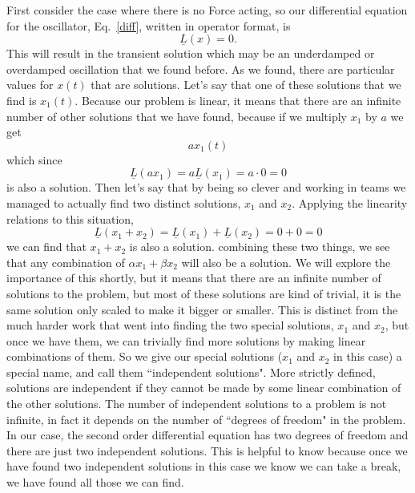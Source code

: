 \documentclass[]{revtex4}
\newcommand{\sm}[1]{{\[#1\]}}
\newcommand{\st}[1]{{\color{red}\bfseries #1}}
\begin{document}
First consider the case where there is no Force acting, so our differential equation for the
oscillator, Eq.~\ref{diff}, written in operator format, is
\sm{\underline{L}(x)=0.}
This will result in the transient solution which may be an underdamped or overdamped
oscillation that we found before.  As we found, there are particular values for $x(t)$ that
are solutions.  Let's say that one of these solutions that we find is $x_1(t)$.  Because our
problem is linear, it means that there are an infinite number of other solutions that we
have found, because if we multiply $x_1$ by
$a$ we get
\st{
  \begin{equation}
    a x_1(t)
  \end{equation}
}
which since
\st{
  \begin{equation}
    \underline{L}(ax_1) = a \underline{L}(x_1) = a \cdot 0 = 0
  \end{equation}
}
is also a solution.  Then let's say that by being so clever and working in teams we managed to actually find two distinct solutions,
$x_1$ and $x_2$.  Applying the linearity relations to this situation,
\st{
  \begin{equation}
    \underline{L}(x_1+x_2) = \underline{L}(x_1) + \underline{L}(x_2) = 0 + 0 = 0
  \end{equation}
}
we can find that $x_1+x_2$ is also a solution. combining these two things, we see that any
combination of $\alpha x_1 + \beta x_2$ will also be a solution.  We will explore the
importance of this shortly, but it means that there are an infinite number of solutions to
the problem, but most of these solutions are kind of trivial, it is the same solution only
scaled to make it bigger or smaller.   This is distinct from the much harder work that went
into finding the two special solutions, $x_1$ and $x_2$, but once we have them, we can
trivially find more solutions by making linear combinations of them.  So we give our special
solutions ($x_1$ and $x_2$ in this case) a special name, and call them ``independent
solutions". More strictly defined, solutions are independent if they cannot be made by some
linear combination of the other solutions.  The number of independent solutions to a problem
is not infinite, in fact it depends on the number of ``degrees of freedom" in the problem.
In our case, the second order differential equation has two degrees of freedom and there are
just two independent solutions.  This is helpful to know because once we have found two
independent solutions in this case we know we can take a break, we have found all those we
can find.
\end{document}
